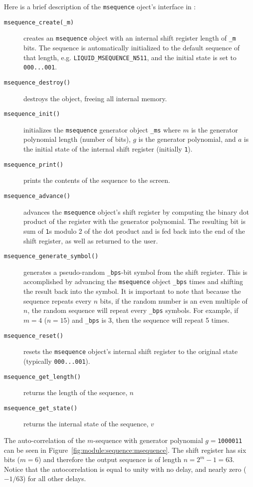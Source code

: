 Here is a brief description of the {\tt msequence} oject's interface in
\liquid:
\begin{description}
\item[{\tt msequence\_create(\_m)}]
    creates an {\tt msequence} object with an internal shift register length
    of {\tt \_m} bits.
    The sequence is automatically initialized to the default sequence of that
    length, e.g. {\tt LIQUID\_MSEQUENCE\_N511}, and the initial state is set
    to {\tt 000...001}.
\item[{\tt msequence\_destroy()}]
    destroys the object, freeing all internal memory.
\item[{\tt msequence\_init()}]
    initializes the {\tt msequence} generator object {\tt \_ms} where
    $m$ is the generator polynomial length (number of bits),
    $g$ is the generator polynomial, and
    $a$ is the initial state of the internal shift register (initially
    {\tt  1}).
\item[{\tt msequence\_print()}]
    prints the contents of the sequence to the screen.
\item[{\tt msequence\_advance()}]
    advances the {\tt msequence} object's shift register by computing the
    binary dot product of the register with the generator polynomial.
    The resulting bit is sum of {\tt 1}s modulo 2 of the dot product and is
    fed back into the end of the shift register, as well as returned to the
    user.
\item[{\tt msequence\_generate\_symbol()}]
    generates a pseudo-random {\tt \_bps}-bit symbol from the shift register.
    This is accomplished by advancing the {\tt msequence} object {\tt \_bps}
    times and shifting the result back into the symbol.
    It is important to note that because the sequence repeats every $n$ bits,
    if the random number is an even multiple of $n$, the random sequence will
    repeat every {\tt \_bps} symbols.
    For example, if $m=4$ ($n=15$) and {\tt \_bps} is 3, then the sequence
    will repeat 5 times.
\item[{\tt msequence\_reset()}]
    resets the {\tt msequence} object's internal shift register to the
    original state (typically {\tt 000...001}).
\item[{\tt msequence\_get\_length()}]
    returns the length of the sequence, $n$
\item[{\tt msequence\_get\_state()}]
    returns the internal state of the sequence, $v$
\end{description}

The auto-correlation of the $m$-sequence with generator polynomial
$g=${\tt 1000011}
can be seen in Figure~\ref{fig:module:sequence:msequence}.
The shift register has six bits ($m=6$) and therefore the output sequence is
of length $n=2^m-1=63$.
Notice that the autocorrelation is equal to unity with no delay, and nearly
zero ($-1/63$) for all other delays.

